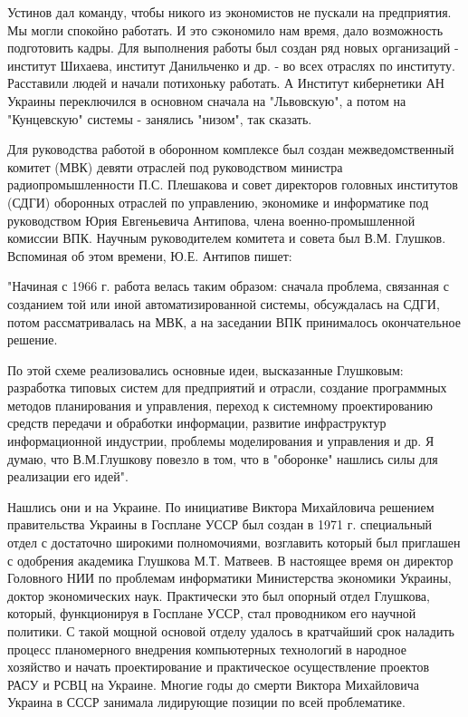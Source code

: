 Устинов дал команду, чтобы никого из экономистов не пускали на предприятия. Мы
могли спокойно работать. И это сэкономило нам время, дало возможность
подготовить кадры. Для выполнения работы был создан ряд новых организаций -
институт Шихаева, институт Данильченко и др. - во всех отраслях по институту.
Расставили людей и начали потихоньку работать. А Институт кибернетики АН Украины
переключился в основном сначала на "Львовскую", а потом на "Кунцевскую" системы
- занялись "низом", так сказать.

Для руководства работой в оборонном комплексе был создан межведомственный
комитет (МВК) девяти отраслей под руководством министра радиопромышленности П.С.
Плешакова и совет директоров головных институтов (СДГИ) оборонных отраслей по
управлению, экономике и информатике под руководством Юрия Евгеньевича Антипова,
члена военно-промышленной комиссии ВПК. Научным руководителем комитета и совета
был В.М. Глушков. Вспоминая об этом времени, Ю.Е. Антипов пишет:

"Начиная с 1966 г. работа велась таким образом: сначала проблема, связанная с
созданием той или иной автоматизированной системы, обсуждалась на СДГИ, потом
рассматривалась на МВК, а на заседании ВПК принималось окончательное решение.

По этой схеме реализовались основные идеи, высказанные Глушковым: разработка
типовых систем для предприятий и отрасли, создание программных методов
планирования и управления, переход к системному проектированию средств передачи
и обработки информации, развитие инфраструктур информационной индустрии,
проблемы моделирования и управления и др. Я думаю, что В.М.Глушкову повезло в
том, что в "оборонке" нашлись силы для реализации его идей".

Нашлись они и на Украине. По инициативе Виктора Михайловича решением
правительства Украины в Госплане УССР был создан в 1971 г. специальный отдел с
достаточно широкими полномочиями, возглавить который был приглашен с одобрения
академика Глушкова М.Т. Матвеев. В настоящее время он директор Головного НИИ по
проблемам информатики Министерства экономики Украины, доктор экономических наук.
Практически это был опорный отдел Глушкова, который, функционируя в Госплане
УССР, стал проводником его научной политики. С такой мощной основой отделу
удалось в кратчайший срок наладить процесс планомерного внедрения компьютерных
технологий в народное хозяйство и начать проектирование и практическое
осуществление проектов РАСУ и РСВЦ на Украине. Многие годы до смерти Виктора
Михайловича Украина в СССР занимала лидирующие позиции по всей проблематике.

